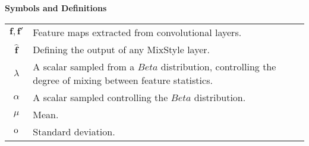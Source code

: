 \centerline{\bf Symbols and Definitions}
\vspace{0.5em}

\bgroup
\def\arraystretch{1.5}  %
\begin{tabular}{c p{3.5in}}
	
	$\displaystyle \mathbf{f}, \mathbf{f}'$ & Feature maps extracted from convolutional layers. \\
	
	$\displaystyle \mathbf{\hat{f}}$ & Defining the output of any MixStyle layer. \\
	
	$\displaystyle \lambda$ & A scalar sampled from a $Beta$ distribution, controlling the degree of mixing between feature statistics. \\
	
	$\displaystyle \alpha$ & A scalar sampled controlling the $Beta$ distribution. \\
	
	$\displaystyle \mu$ & Mean. \\
	
	$\displaystyle {\textnormal{o}}$ & Standard deviation. \\
	
\end{tabular}
\egroup

\clearpage